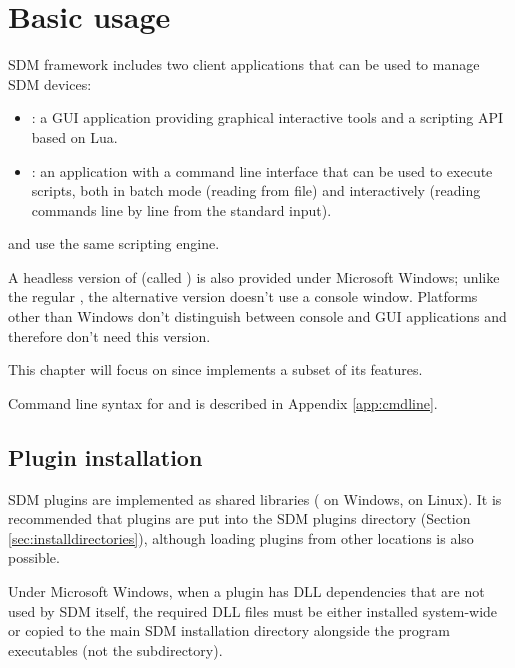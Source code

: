 \documentclass[a4paper,12pt,twoside,extrafontsizes]{memoir}
\begin{document}
\chapter{Basic usage}
\label{ch:basicusage}

SDM framework includes two client applications that can be used to manage SDM devices:

\begin{itemize}
	\item {}: a GUI application providing graphical interactive tools and a scripting API based on Lua.
	\item {}: an application with a command line interface that can be used to execute scripts, both in batch mode (reading from file) and interactively (reading commands line by line from the standard input).
\end{itemize}

 and  use the same scripting engine.

A headless version of  (called ) is also provided under Microsoft Windows; unlike the regular , the alternative version doesn't use a console window. Platforms other than Windows don't distinguish between console and GUI applications and therefore don't need this version.

This chapter will focus on  since  implements a subset of its features.

Command line syntax for  and  is described in Appendix \ref{app:cmdline}.

\section{Plugin installation}

SDM plugins are implemented as shared libraries ( on Windows,  on Linux). It is recommended that plugins are put into the SDM plugins directory (Section \ref{sec:installdirectories}), although loading plugins from other locations is also possible.

Under Microsoft Windows, when a plugin has DLL dependencies that are not used by SDM itself, the required DLL files must be either installed system-wide or copied to the main SDM installation directory alongside the program executables (not the  subdirectory).
\end{document}
